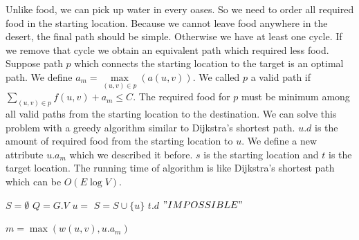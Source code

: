 \documentclass{book}
\begin{document}
\begin{enumerate}
\begin{enumerate}
\begin{itemize}
            Unlike food, we can pick up water in every oases. So we need to order all required food in the starting location. Because we cannot leave food anywhere in the desert, the final path should be simple. Otherwise we have at least one cycle. If we remove that cycle we obtain an equivalent path which required less food. Suppose path $p$ which connects the starting location to the target is an optimal path. We define $a_m = \max\limits_{(u, v) \in p}(a(u, v))$. We called $p$ a valid path if $\sum_{(u, v) \in p}{f(u,v)} + a_m \le C$. The required food for $p$ must be minimum among all valid paths from the starting location to the destination. We can solve this problem with a greedy algorithm similar to Dijkstra's shortest path. $u.d$ is the amount of required food from the starting location to $u$. We define a new attribute $u.a_m$ which we described it before. $s$ is the starting location and $t$ is the target location. The running time of algorithm is like Dijkstra's shortest path which can be $O(E\log V)$.
            \begin{algorithm*}[h!]
                    \begin{algorithmic}[1]
                                    \State {}
                                    \State $S = \emptyset$
                                    \State $Q = G.V$
                                            \State $u = $ 
                                            \State $S = S \cup \{u\}$
                                                    \State {}
                                            \EndFor
                                    \EndWhile
                                            \State \Return $t.d$
                                    \Else
                                            \State $"IMPOSSIBLE"$
                                    \EndIf
                            \EndFunction
                    \end{algorithmic}
            \end{algorithm*}
            \begin{algorithm*}[h!]
                    \begin{algorithmic}[1]
                                    \State $m = \max(w(u, v), u.a_m)$

\end{algorithmic}
\end{algorithm*}
\end{itemize}
\end{enumerate}
\end{enumerate}
\end{document}
